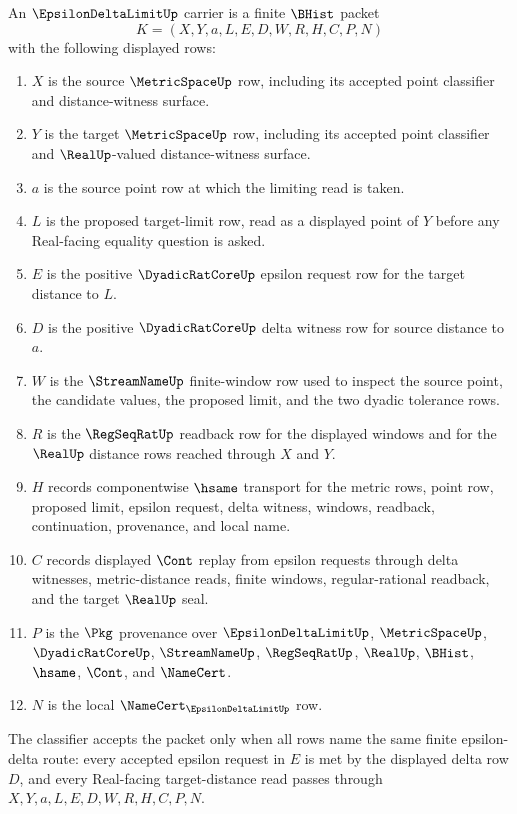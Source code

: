\begin{definition}
\label{def:epsilon-delta-limit-carrier}
An $\EpsilonDeltaLimitUp$ carrier is a finite $\BHist$ packet
$$
K=(X,Y,a,L,E,D,W,R,H,C,P,N)
$$
with the following displayed rows:
\begin{enumerate}
\item $X$ is the source $\MetricSpaceUp$ row, including its accepted point classifier and distance-witness surface.
\item $Y$ is the target $\MetricSpaceUp$ row, including its accepted point classifier and $\RealUp$-valued distance-witness surface.
\item $a$ is the source point row at which the limiting read is taken.
\item $L$ is the proposed target-limit row, read as a displayed point of $Y$ before any Real-facing equality question is asked.
\item $E$ is the positive $\DyadicRatCoreUp$ epsilon request row for the target distance to $L$.
\item $D$ is the positive $\DyadicRatCoreUp$ delta witness row for source distance to $a$.
\item $W$ is the $\StreamNameUp$ finite-window row used to inspect the source point, the candidate values, the proposed limit, and the two dyadic tolerance rows.
\item $R$ is the $\RegSeqRatUp$ readback row for the displayed windows and for the $\RealUp$ distance rows reached through $X$ and $Y$.
\item $H$ records componentwise $\hsame$ transport for the metric rows, point row, proposed limit, epsilon request, delta witness, windows, readback, continuation, provenance, and local name.
\item $C$ records displayed $\Cont$ replay from epsilon requests through delta witnesses, metric-distance reads, finite windows, regular-rational readback, and the target $\RealUp$ seal.
\item $P$ is the $\Pkg$ provenance over $\EpsilonDeltaLimitUp$, $\MetricSpaceUp$, $\DyadicRatCoreUp$, $\StreamNameUp$, $\RegSeqRatUp$, $\RealUp$, $\BHist$, $\hsame$, $\Cont$, and $\NameCert$.
\item $N$ is the local $\NameCert_{\EpsilonDeltaLimitUp}$ row.
\end{enumerate}
The classifier accepts the packet only when all rows name the same finite epsilon-delta route: every accepted epsilon request in $E$ is met by the displayed delta row $D$, and every Real-facing target-distance read passes through $X,Y,a,L,E,D,W,R,H,C,P,N$.
\end{definition}

